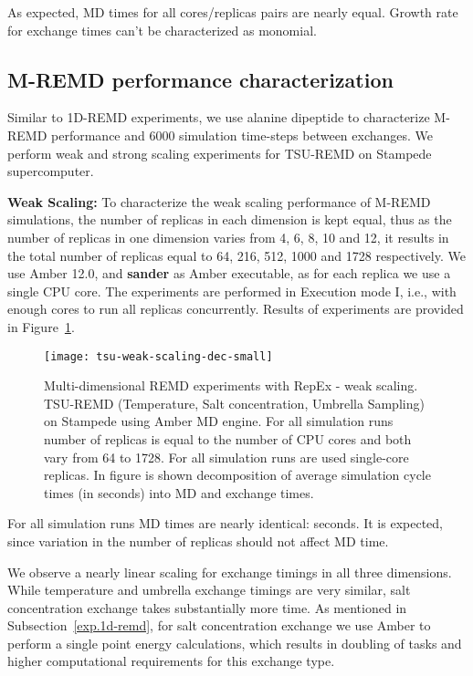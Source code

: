 \documentclass{sig-alternate-05-2015}
\begin{document}
As expected, MD times for all cores/replicas pairs are nearly equal. Growth rate for exchange times can't be characterized as monomial.

\subsection{M-REMD performance characterization}

Similar to 1D-REMD experiments, we use alanine dipeptide to characterize M-REMD performance and 6000 simulation time-steps between exchanges. We perform weak and strong scaling experiments for TSU-REMD on Stampede supercomputer.

{\bf Weak Scaling:} To characterize the weak scaling performance of M-REMD simulations, the number of replicas in each dimension is kept equal, thus as the number of replicas in one dimension varies from 4, 6, 8, 10 and 12, it results in the total number of replicas equal to 64, 216, 512, 1000 and 1728 respectively. We use Amber 12.0, and \textbf{sander} as Amber executable, as for each replica we use a single CPU core. The experiments are performed in Execution mode I, i.e., with enough cores to run all replicas concurrently.  Results of experiments are provided in Figure~\ref{fig:tsu_weak}.

\begin{figure}[ht!]  \centering \texttt{[image: tsu-weak-scaling-dec-small]} \caption{\small{Multi-dimensional REMD experiments with RepEx - weak scaling. TSU-REMD (Temperature, Salt concentration, Umbrella Sampling) on Stampede using Amber MD engine. For all simulation runs number of replicas is equal to the number of CPU cores and both vary from 64 to 1728. For all simulation runs are used single-core replicas. In figure is shown decomposition of average simulation cycle times  (in seconds) into MD and exchange times.} }
\label{fig:tsu_weak} 
\end{figure}

For all simulation runs MD times are nearly identical:  seconds. It is expected, since variation in the number of replicas should not affect MD time. 
 
We observe a nearly linear scaling for exchange timings in all three dimensions. While temperature and umbrella exchange timings are very similar, salt concentration exchange takes substantially more time. As mentioned in Subsection~\ref{exp.1d-remd}, for salt concentration exchange we use Amber to perform a single point energy calculations, which results in doubling of tasks and higher computational requirements for this exchange type.
\end{document}
